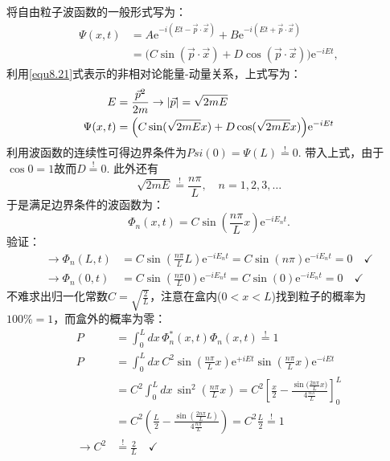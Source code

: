 将自由粒子波函数的一般形式写为：
\begin{align*}
	\Psi (x, t) &= A \mathrm{e}^{-i (Et - \vec{p} \cdot \vec{x})} + B \mathrm{e}^{-i (Et + \vec{p} \cdot \vec{x})} \\
	&= \Big( C \sin (\vec{p} \cdot \vec{x}) + D \cos (\vec{p} \cdot \vec{x}) \Big) \mathrm{e}^{-iEt},
\end{align*}
利用\eqref{equ8.21}式表示的非相对论能量-动量关系，上式写为：
\begin{align}
	E &= \frac{\vec{p}^2}{2m} \to |\vec{p}| = \sqrt{2mE} \notag \\
\label{equ8.28}
	\Psi (x, t) &= \Big( C \sin (\sqrt{2mE} x) + D \cos (\sqrt{2mE} x) \Big) \mathrm{e}^{-iEt}
\end{align}
利用波函数的连续性可得边界条件为$Psi(0) = \Psi(L) \stackrel{!}{=} 0.$ 带入上式，由于$\cos 0 = 1$故而$D \stackrel{!}{=} 0$. 此外还有
\begin{equation}
\label{equ8.29}
	\sqrt{2mE} \stackrel{!}{=} \frac{n\pi}{L}, \quad n = 1, 2, 3, \dots
\end{equation}
于是满足边界条件的波函数为：
\begin{equation}
\label{equ8.30}
	\Phi_n (x, t) = C \sin \left( \frac{n \pi}{L} x \right) \mathrm{e}^{-i E_n t}.
\end{equation}
验证：
\begin{align*}
	\to \Phi_n (L, t) &= C \sin \left( \frac{n\pi}{L} L \right) \mathrm{e}^{-i E_n t} = C \sin(n \pi) \mathrm{e}^{-i E_n t} = 0 \quad \checkmark \\
	\to \Phi_n (0, t) &= C \sin \left( \frac{n\pi}{L} 0 \right) \mathrm{e}^{-i E_n t} = C \sin (0) \mathrm{e}^{-i E_n t} = 0 \quad \checkmark
\end{align*}
不难求出归一化常数$C = \sqrt{ \frac{2}{L} }$，注意在盒内($0 < x < L$)找到粒子的概率为$100 \% = 1$，而盒外的概率为零：
\begin{align*}
	P &= \int_0^L dx\, \Phi^*_n (x, t) \Phi_n (x, t) \stackrel{!}{=} 1 \\
	P &= \int_0^L dx\, C^2 \sin \left( \frac{n \pi}{L} x \right) \mathrm{e}^{+iEt} \sin \left( \frac{n \pi}{L} x \right) \mathrm{e}^{-iEt} \\
	&= C^2 \int_0^L dx\, \sin^2 \left( \frac{n \pi}{L} x \right) = C^2 \left[ \frac{x}{2} - \frac{ \sin\big( \frac{2n\pi}{L} x \big) }{ 4 \frac{n \pi}{L} } \right]_0^L \\
	&= C^2 \left( \frac{L}{2} - \frac{ \sin \left(\frac{2n\pi}{L} L \right) }{ 4 \frac{n \pi}{L} } \right) = C^2 \frac{L}{2} \stackrel{!}{=} 1 \\
	\to C^2 &\stackrel{!}{=} \frac{2}{L} \quad \checkmark
\end{align*}
